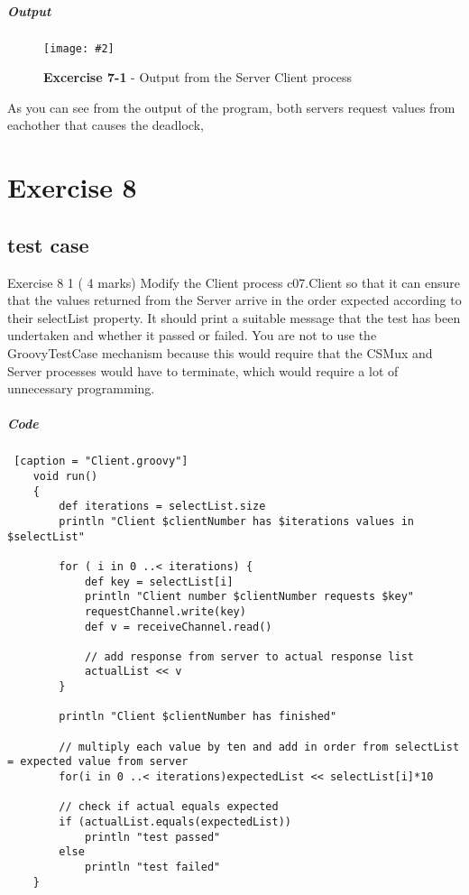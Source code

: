 \documentclass[10pt, a4paper]{article}
\newcommand{\figuremacro}[5]{
    \begin{figure}[#1]
        \centering
        \texttt{[image: \#2]}
        \caption[#3]{\textbf{#3}#4}
        \label{fig:#2}
    \end{figure}
}
\begin{document}
	\subparagraph{Output}
	
			
	\figuremacro{H}{deadlock}{Excercise 7-1}{ -  Output from the Server Client process}{0.5}
	
	As you can see from the output of the program, 
	both servers request values from eachother that causes the deadlock, 
	
	
	
	
	\setcounter{section}{8}
   \section*{Exercise 8}
   
   \setcounter{subsection}{0}
   \subsection{test case}

   Exercise 8 1   ( 4 marks)
   Modify the Client process c07.Client so that it can ensure that the values returned from the Server arrive in the order expected according to their selectList property.  It should print a suitable message that the test has been undertaken and whether it passed or failed.  You are not to use the GroovyTestCase mechanism because this would require that the CSMux and Server processes would have to terminate, which would require a lot of unnecessary programming.  
   
   \subparagraph{Code} \hfill
   \begin{lstlisting} [caption = "Client.groovy"]
   	void run()
   	{
   		def iterations = selectList.size
   		println "Client $clientNumber has $iterations values in $selectList"
   	
   		for ( i in 0 ..< iterations) {
   			def key = selectList[i]
   			println "Client number $clientNumber requests $key"
   			requestChannel.write(key)
   			def v = receiveChannel.read()
   	
  	 		// add response from server to actual response list
   			actualList << v
   		}
   	
   		println "Client $clientNumber has finished"
   	
   		// multiply each value by ten and add in order from selectList = expected value from server
   		for(i in 0 ..< iterations)expectedList << selectList[i]*10
   	
   		// check if actual equals expected 
   		if (actualList.equals(expectedList))
   			println "test passed"
   		else
   			println "test failed"
   	}\end{lstlisting}
   
\end{document}
